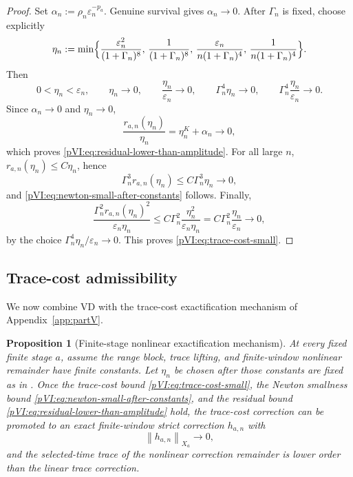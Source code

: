 \documentclass[11pt]{article}
\numberwithin{equation}{section}
\theoremstyle{plain}
\newtheorem{proposition}{Proposition}[section]
\theoremstyle{definition}
\theoremstyle{remark}
\newcommand{\eps}{\varepsilon}
\newcommand{\norm}[2]{\left\|#1\right\|_{#2}}
\begin{document}
\begin{proof}
Set \(\alpha_n:=\rho_n\eps_n^{-p_a}\).  Genuine survival gives \(\alpha_n\to0\).  After \(\Gamma_n\) is fixed, choose explicitly
\[
        \eta_n
        :=\min\Bigl\{
        \frac{\eps_n^2}{(1+\Gamma_n)^8},\,
        \frac{1}{(1+\Gamma_n)^8},\,
        \frac{\eps_n}{n(1+\Gamma_n)^4},\,
        \frac{1}{n(1+\Gamma_n)^4}
        \Bigr\}.
\]
Then
\[
        0<\eta_n<\eps_n,
        \qquad
        \eta_n\to0,
        \qquad
        \frac{\eta_n}{\eps_n}\to0,
        \qquad
        \Gamma_n^4\eta_n\to0,
        \qquad
        \Gamma_n^4\frac{\eta_n}{\eps_n}\to0.
\]  Since \(\alpha_n\to0\) and \(\eta_n\to0\),
\[
        \frac{r_{a,n}(\eta_n)}{\eta_n}
        =\eta_n^K+\alpha_n\to0,
\]
which proves \eqref{pVI:eq:residual-lower-than-amplitude}.  For all large \(n\), \(r_{a,n}(\eta_n)\le C\eta_n\), hence
\[
        \Gamma_n^3 r_{a,n}(\eta_n)
        \le C\Gamma_n^3\eta_n\to0,
\]
and \eqref{pVI:eq:newton-small-after-constants} follows.  Finally,
\[
        \frac{\Gamma_n^2r_{a,n}(\eta_n)^2}{\eps_n\eta_n}
        \le
        C\Gamma_n^2\frac{\eta_n^2}{\eps_n\eta_n}
        =C\Gamma_n^2\frac{\eta_n}{\eps_n}\to0,
\]
by the choice \(\Gamma_n^4\eta_n/\eps_n\to0\).  This proves \eqref{pVI:eq:trace-cost-small}.
\end{proof}

\subsection{Trace-cost admissibility}

We now combine VD with the trace-cost exactification mechanism of Appendix~\ref{app:partV}.

\begin{proposition}[Finite-stage nonlinear exactification mechanism]\label{pVI:prop:finite-stage-newton}
At every fixed finite stage \(a\), assume the range block, trace lifting, and finite-window nonlinear remainder have finite constants.  Let \(\eta_n\) be chosen after those constants are fixed as in .  Once the trace-cost bound \eqref{pVI:eq:trace-cost-small}, the Newton smallness bound \eqref{pVI:eq:newton-small-after-constants}, and the residual bound \eqref{pVI:eq:residual-lower-than-amplitude} hold, the trace-cost correction can be promoted to an exact finite-window strict correction \(h_{a,n}\) with
\begin{equation}\label{pVI:eq:strong-correction-small}
        \norm{h_{a,n}}{X_a}\to0,
\end{equation}
and the selected-time trace of the nonlinear correction remainder is lower order than the linear trace correction.
\end{proposition}
\end{document}

